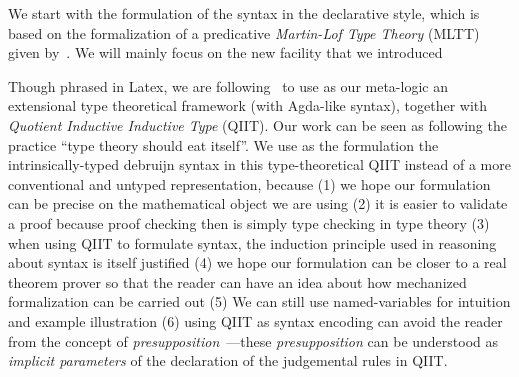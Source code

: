 We start with the formulation of the syntax in the declarative style, which is based on the
formalization of a predicative \textit{Martin-Lof Type Theory} (MLTT)
given by~\citet{coquand2018canonicity}. 
We will mainly focus on the new facility that we introduced 

Though phrased in Latex, we are following~\citet{altkap2016} to use as
our meta-logic an extensional type theoretical framework (with Agda-like syntax), 
together with \textit{Quotient Inductive Inductive Type} (QIIT). Our work can be seen as following the practice ``type theory should eat itself''\cite{dybjer1995internal, chapman2009type}. We use as the formulation the intrinsically-typed debruijn syntax in this type-theoretical QIIT instead of a more conventional and untyped representation, because (1) we hope our formulation can be precise on the mathematical object we are using (2) it is easier to validate a proof because proof checking then is simply type checking in type theory (3) when using QIIT to formulate syntax, the induction principle used in reasoning about syntax is itself justified (4) we hope our formulation can be closer to a real theorem prover so that the reader can have an idea about how mechanized formalization can be carried out (5) We can still use named-variables for intuition and example illustration (6) using QIIT as syntax encoding can avoid the reader from the concept of \textit{presupposition}~\citet{gratzer-sterling-birkedal:2019}---these \textit{presupposition} can be understood as \textit{implicit parameters} of the declaration of the judgemental rules in QIIT.



